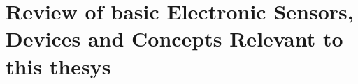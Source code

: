 \section{Review of basic Electronic Sensors, Devices and Concepts Relevant to this thesys}\label{sec:electronic-background}
	
	
	
	
	
	
	